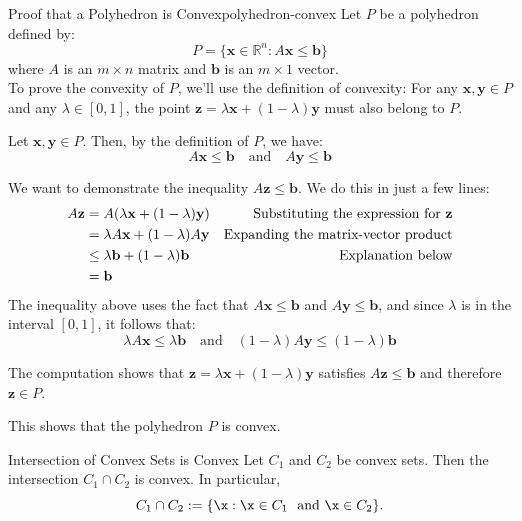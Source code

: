 \begin{example}{Proof that a Polyhedron is Convex}{polyhedron-convex}
Let \( P \) be a polyhedron defined by:
\[ P = \{\mathbf{x} \in \mathbb{R}^n : A\mathbf{x} \leq \mathbf{b}\} \]
where \( A \) is an \( m \times n \) matrix and \( \mathbf{b} \) is an \( m \times 1 \) vector.\\

To prove the convexity of \( P \), we'll use the definition of convexity: For any \( \mathbf{x}, \mathbf{y} \in P \) and any \( \lambda \in [0,1] \), the point \( \mathbf{z} = \lambda \mathbf{x} + (1-\lambda) \mathbf{y} \) must also belong to \( P \).

Let \( \mathbf{x}, \mathbf{y} \in P \). Then, by the definition of \( P \), we have:
\[ A\mathbf{x} \leq \mathbf{b} \ \ \ \text{ and } \ \ \  A\mathbf{y} \leq \mathbf{b} \]

We want to demonstrate the inequality \( A\mathbf{z} \leq \mathbf{b} \). 
We do this in just a few lines:
\begin{align*}
A\mathbf{z} &= A(\lambda \mathbf{x} + (1-\lambda) \mathbf{y}) & \text{Substituting the expression for \( \mathbf{z} \)}\\
&=\lambda A\mathbf{x} + (1-\lambda) A\mathbf{y} & \text{Expanding the matrix-vector product}\\
&\leq \lambda \mathbf{b} + (1-\lambda) \mathbf{b} & \text{Explanation below}\\
& = \mathbf{b}
\end{align*}
The inequality above uses the fact that \( A\mathbf{x} \leq \mathbf{b} \) and \( A\mathbf{y} \leq \mathbf{b} \), and since \( \lambda \) is in the interval \([0,1]\), it follows that:
\[ \lambda A\mathbf{x} \leq \lambda \mathbf{b}  \ \ \ 
\text{ and } \ \ \ 
(1-\lambda) A\mathbf{y} \leq (1-\lambda) \mathbf{b} \]

The computation shows that \( \mathbf{z} = \lambda \mathbf{x} + (1-\lambda) \mathbf{y} \) satisfies \( A\mathbf{z} \leq \mathbf{b} \) and therefore \( \mathbf{z} \in P \).

This shows that the polyhedron \( P \) is convex.
\end{example}




\begin{lemma}{Intersection of Convex Sets is Convex}{}
Let $C_1$ and $C_2$ be convex sets.  Then the intersection $C_1 \cap C_2$ is convex.  
In particular, 
$$C_1 \cap C_2 := \{ \x :  \x \in C_1 \ \text{ and } \x \in C_2\}.
$$
\end{lemma}

